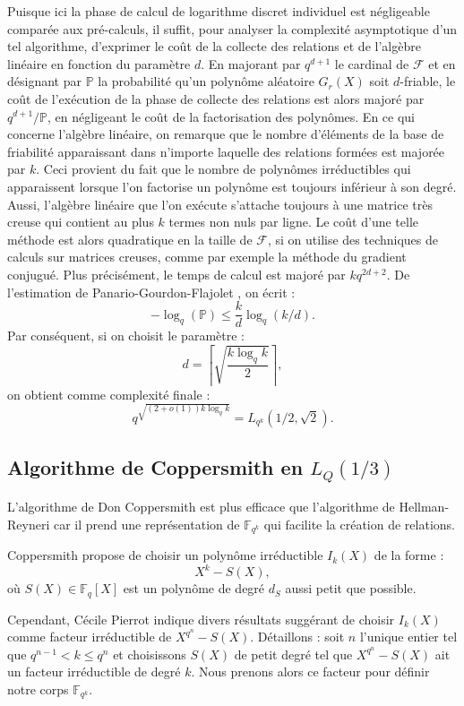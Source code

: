 \documentclass[a4paper, titlepage, 11pt]{article}
\theoremstyle{definition}
\theoremstyle{remark}
\def\o{o}
\def\gf #1{\mathbb{F}_{#1}}
\begin{document}
Puisque ici la phase de calcul de logarithme discret individuel est négligeable comparée aux pré-calculs, il suffit, pour analyser la complexité asymptotique d'un tel algorithme, d'exprimer le coût de la collecte des relations et de l'algèbre linéaire en fonction du paramètre $d$. En majorant par $q^{d+1}$ le cardinal de $\mathcal{F}$ et en désignant par $\mathbb{P}$ la probabilité qu'un polynôme aléatoire $G_r(X)$ soit $d$-friable, le coût de l'exécution de la phase de collecte des relations est alors majoré par $q^{d+1}/\mathbb{P}$, en négligeant le coût de la factorisation des polynômes.
En ce qui concerne l'algèbre linéaire, on remarque que le nombre d'éléments de la base de friabilité apparaissant dans n'importe laquelle des relations formées est majorée par $k$. Ceci provient du fait que le nombre de polynômes irréductibles qui apparaissent lorsque l'on factorise un polynôme est toujours inférieur à son degré. Aussi, l’algèbre linéaire que l'on exécute s'attache toujours à une matrice très creuse qui contient au plus $k$ termes non nuls par ligne. Le coût d'une telle méthode est alors quadratique en la taille de $\mathcal{F}$, si on utilise des techniques de calculs sur matrices creuses, comme par exemple la méthode du gradient conjugué. Plus précisément, le temps de calcul est majoré par $kq^{2d+2}$.
De l'estimation de Panario-Gourdon-Flajolet \cite{PGF98}, on écrit :
$$-\log_q(\mathbb{P}) \leqslant\frac{k}{d}\log_q(k/d).$$
Par conséquent, si on choisit le paramètre :
$$d = \left\lceil \sqrt{ \frac{k\log_q k}{2} } \right\rceil,$$
on obtient comme complexité finale :
$$q^{\sqrt{(2+\o(1))k\log_qk}} = L_{q^k}(1/2,\sqrt 2).$$

\subsection{Algorithme de Coppersmith en $L_{Q}(1/3)$}

L'algorithme de Don Coppersmith \cite{coppersmith1984} est plus efficace que l'algorithme de Hellman-Reyneri car il prend une représentation de $\gf{q^k}$ qui facilite la création de relations.

Coppersmith propose de choisir un polynôme irréductible $I_k(X)$ de la forme : $$X^k - S(X),$$ où $S(X) \in \gf{q}[X]$ est un polynôme de degré $d_S$ aussi petit que possible.

Cependant, Cécile Pierrot \cite{pierrot2016} indique divers résultats \cite{joux2006, joux2013} suggérant de choisir $I_k(X)$ comme facteur irréductible de $X^{q^n}-S(X)$. Détaillons : soit $n$ l'unique entier tel que $q^{n-1} < k \leqslant q^n$ et choisissons $S(X)$ de petit degré tel que $X^{q^n}-S(X)$ ait un facteur irréductible de degré $k$. Nous prenons alors ce facteur pour définir notre corps $\gf{q^k}$.
\end{document}
